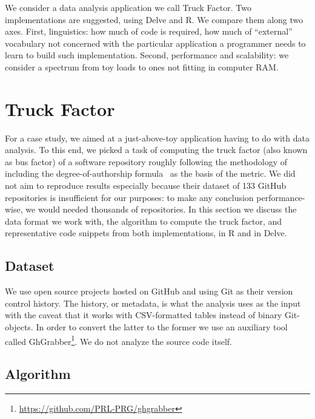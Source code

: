 We consider a data analysis application we call Truck Factor.
Two implementations are suggested, using Delve and R. We compare them
along two axes. First, linguistics: how much of code is required,
how much of ``external'' vocabulary not concerned with the particular
application a programmer needs to learn to build such implementation.
Second, performance and scalability: we consider a spectrum from
toy loads to ones not fitting in computer RAM.

\section{Truck Factor}

For a case study, we aimed at a just-above-toy application having to
do with data analysis. To this end, we picked a task of computing the
truck factor (also known as bus factor) of a software repository
roughly following the methodology of~\cite{tf} including the
degree-of-authorship formula~\cite{doa} as the basis of the metric.
We did not aim to reproduce results
especially because their dataset of 133 GitHub repositories is insufficient
for our purposes: to make any conclusion performance-wise, we would needed
thousands of repositories. In this section we discuss the data format we work with,
the algorithm to compute the truck factor, and representative code snippets
from both implementations, in R and in Delve.

\subsection{Dataset}

We use open source projects hosted on GitHub and using Git as their
version control history. The history, or metadata, is what the analysis
uses as the input with the caveat that it works with CSV-formatted
tables instead of binary Git-objects. In order to convert the latter
to the former we use an auxiliary tool called
GhGrabber\footnote{\url{https://github.com/PRL-PRG/ghgrabber}}.
We do not analyze the source code itself.

\subsection{Algorithm}

